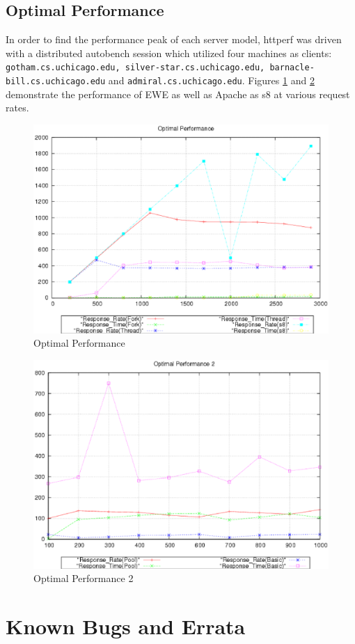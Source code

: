 \documentclass{article}
\begin{document}
\subsection{Optimal Performance}
In order to find the performance peak of each server model, httperf was driven with a distributed autobench session which utilized four machines as clients: \texttt{gotham.cs.uchicago.edu, silver-star.cs.uchicago.edu, barnacle-bill.cs.uchicago.edu} and \texttt{admiral.cs.uchicago.edu}.
Figures \ref{perfpeak1} and \ref{perfpeak2} demonstrate the performance of EWE as well as Apache as s8 at various request rates.
\begin{figure}[ht]\centering
        \includegraphics[width=.7\textwidth]{peaks1.eps}
        \caption{Optimal Performance}\label{perfpeak1}
\end{figure}
\begin{figure}[hb]\centering
        \includegraphics[width=.7\textwidth]{peaks2.eps}
        \caption{Optimal Performance 2}\label{perfpeak2}
\end{figure}

\section{Known Bugs and Errata}\label{bugs}
\end{document}
